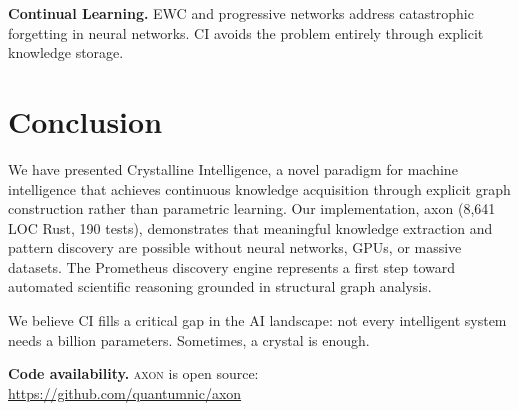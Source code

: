 \documentclass[11pt,twocolumn]{article}
\begin{document}
\textbf{Continual Learning.} EWC \citep{kirkpatrick2017overcoming} and progressive networks \citep{rusu2016progressive} address catastrophic forgetting in neural networks. CI avoids the problem entirely through explicit knowledge storage.

\section{Conclusion}
\label{sec:conclusion}

We have presented Crystalline Intelligence, a novel paradigm for machine intelligence that achieves continuous knowledge acquisition through explicit graph construction rather than parametric learning. Our implementation, axon (8{,}641 LOC Rust, 190 tests), demonstrates that meaningful knowledge extraction and pattern discovery are possible without neural networks, GPUs, or massive datasets. The Prometheus discovery engine represents a first step toward automated scientific reasoning grounded in structural graph analysis.

We believe CI fills a critical gap in the AI landscape: not every intelligent system needs a billion parameters. Sometimes, a crystal is enough.

\vspace{6pt}
\noindent\textbf{Code availability.} \textsc{axon} is open source:\\
\url{https://github.com/quantumnic/axon}
\end{document}
